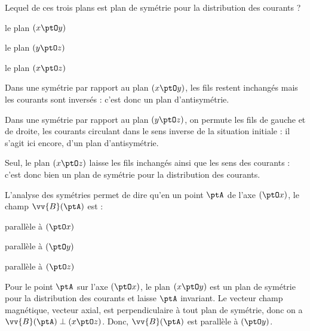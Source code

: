 \begin{enonce}
Lequel de ces trois plans est plan de symétrie pour la distribution des courants ?
	\begin{listeQCM3Colonnes}
		\item le plan $(x \ptO y)$
		\item le plan $(y \ptO z)$
		\item le plan $(x \ptO z)$
	\end{listeQCM3Colonnes}
\bigskip
\end{enonce}

\reponse{$\reponseC{}$}

\begin{corrige}
Dans une symétrie par rapport au plan $(x \ptO y)$, les fils restent inchangés mais les courants sont inversés  : c'est donc un plan d'antisymétrie.

Dans une symétrie par rapport au plan $(y \ptO z)$, on permute les fils de gauche et de droite, les courants circulant dans le sens inverse de la situation initiale : il s'agit ici encore, d'un plan d'antisymétrie.

Seul, le plan $(x \ptO z)$ laisse les fils inchangés ainsi que les sens des courants : c'est donc bien un plan de symétrie pour la distribution des courants. 
\end{corrige}




\begin{enonce}
L'analyse des symétries permet de dire qu'en un point $\ptA$ de l'axe $(\ptO x)$, le champ $\vv{B}(\ptA)$ est : 
\begin{listeQCM3Colonnes}
		\item parallèle à $(\ptO x)$
		\item parallèle à $(\ptO y)$
		\item parallèle à $(\ptO z)$
\end{listeQCM3Colonnes}
\bigskip
\end{enonce}

\reponse{$\reponseB{}$}

\begin{corrige}
Pour le point $\ptA$ sur l'axe $(\ptO x)$, le plan $(x \ptO y)$ est un plan de symétrie pour la distribution des courants et laisse $\ptA$ invariant. Le vecteur champ magnétique, vecteur axial, est perpendiculaire à tout plan de symétrie, donc on a $\vv{B}(\ptA) \perp (x \ptO z)$. Donc, $\vv{B}(\ptA)$ est parallèle à  $(\ptO y)$. 
\end{corrige}

